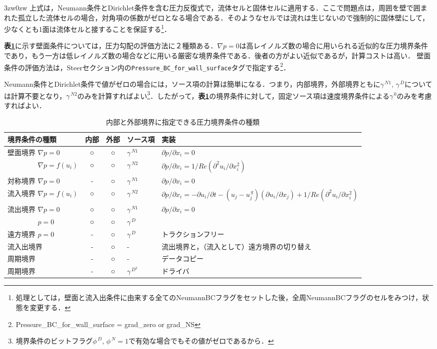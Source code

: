 \begin{indentation}{3zw}{0zw}
\noindent 上式は，Neumann条件とDirichlet条件を含む圧力反復式で，流体セルと固体セルに適用する．ここで問題点は，周囲を壁で囲まれた孤立した流体セルの場合，対角項の係数がゼロとなる場合である．そのようなセルでは流れは生じないので強制的に固体壁にして，少なくとも1面は流体セルと接することを保証する\footnote{処理としては，壁面と流入出条件に由来する全てのNeumannBCフラグをセットした後，全周NeumannBCフラグのセルをみつけ，状態を変更する．}．

\textbf{表\ref{tbl:BC of pressure}}に示す壁面条件については，圧力勾配の評価方法に２種類ある．$\nabla p=0$は高レイノルズ数の場合に用いられる近似的な圧力境界条件であり，もう一方は低レイノルズ数の場合などに用いる厳密な境界条件である．後者の方がよい近似であるが，計算コストは高い．
壁面条件の評価方法は，Steerセクション内の\verb|Pressure_BC_for_wall_surface|タグで指定する\footnote{Pressure\_BC\_for\_wall\_surface = grad\_zero or grad\_NS}．

Neumann条件とDirichlet条件で値がゼロの場合には，ソース項の計算は簡単になる．つまり，内部境界，外部境界ともに$\gamma^{\,N1},\,\gamma^{\,D}$については計算不要となり，$\gamma^{\,N2}$のみを計算すればよい\footnote{境界条件のビットフラグ$\phi^{\,D},\,\phi^{\,N}=1$で有効な場合でもその値がゼロであるから．}．したがって，\textbf{表\ref{tbl:BC of pressure}}の境界条件に対して，固定ソース項は速度境界条件による$\gamma^{\,0}$のみを考慮すればよい．

\begin{table}[htdp]
\small
\caption{内部と外部境界に指定できる圧力境界条件の種類}
\begin{center}
\begin{tabular}{l|ccl|l} \toprule
境界条件の種類 & 内部 & 外部 & ソース項 & 実装\\ \midrule
壁面境界 $\nabla p=0$ & ○ & ○ & $\gamma^{\,N1}$ & $\partial p/\partial x_i =0$\\
　　　　 $\nabla p=f(u_i)$ & ○ & ○ & $\gamma^{\,N2}$ & $\partial p/\partial x_i =  1/Re (\partial^2 u_i/\partial x_i^2)$\\
対称境界 $\nabla p=0$ & - & ○ & $\gamma^{\,N1}$ & $\partial p/\partial x_i =0$\\
流入境界 $\nabla p=f(u_i)$ & ○ & ○ & $\gamma^{\,N2}$ & $\partial p/\partial x_i = - \partial u_i / \partial t -(u_j-u_j^{\,g}) (\partial u_i / \partial x_j) + 1/Re (\partial^2 u_i/\partial x_i^2)$\\
流出境界 $\nabla p=0$ & ○ & ○ & $\gamma^{\,N1}$ & $\partial p/\partial x_i =0$\\
　　　　 $p=0$ & ○ & ○ & $\gamma^{\,D}$ & \\
遠方境界 $p=0$ & - & ○ & $\gamma^{\,D}$ & トラクションフリー\\
流入出境界 & - & ○ & -  & 流出境界と，（流入として）遠方境界の切り替え\\
周期境界 & - & ○ & - & データコピー\\ 
周期境界 & - & ○ & $\gamma^{\,D^2}$ & ドライバ\\ \bottomrule
\end{tabular}
\end{center}
\label{tbl:BC of pressure}
\end{table}


\end{indentation}
